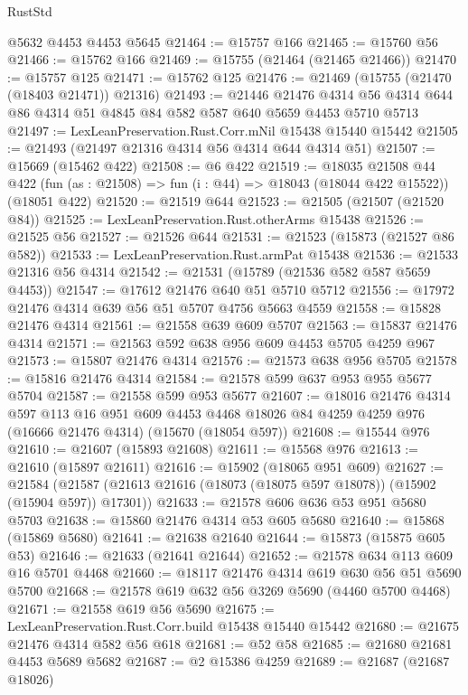 \begin{lexlean}{RustStd}
\begin{coremodule}
    @5632
    @4453
    @4453
    @5645
@21464 := @15757 @166
@21465 := @15760 @56
@21466 := @15762 @166
@21469 := @15755 (@21464 (@21465 @21466))
@21470 := @15757 @125
@21471 := @15762 @125
@21476 := @21469 (@15755 (@21470 (@18403 @21471)) @21316)
@21493 := @21446
    @21476
    @4314
    @56
    @4314
    @644
    @86
    @4314
    @51
    @4845
    @84
    @582
    @587
    @640
    @5659
    @4453
    @5710
    @5713
@21497 := LexLeanPreservation.Rust.Corr.mNil @15438 @15440 @15442
@21505 := @21493 (@21497 @21316 @4314 @56 @4314 @644 @4314 @51)
@21507 := @15669 (@15462 @422)
@21508 := @6 @422
@21519 := @18035
    @21508
    @44
    @422
    (fun (as : @21508) => fun (i : @44) => @18043 (@18044 @422 @15522))
    (@18051 @422)
@21520 := @21519 @644
@21523 := @21505 (@21507 (@21520 @84))
@21525 := LexLeanPreservation.Rust.otherArms @15438
@21526 := @21525 @56
@21527 := @21526 @644
@21531 := @21523 (@15873 (@21527 @86 @582))
@21533 := LexLeanPreservation.Rust.armPat @15438
@21536 := @21533 @21316 @56 @4314
@21542 := @21531 (@15789 (@21536 @582 @587 @5659 @4453))
@21547 := @17612 @21476 @640 @51 @5710 @5712
@21556 := @17972 @21476 @4314 @639 @56 @51 @5707 @4756 @5663 @4559
@21558 := @15828 @21476 @4314
@21561 := @21558 @639 @609 @5707
@21563 := @15837 @21476 @4314
@21571 := @21563 @592 @638 @956 @609 @4453 @5705 @4259 @967
@21573 := @15807 @21476 @4314
@21576 := @21573 @638 @956 @5705
@21578 := @15816 @21476 @4314
@21584 := @21578 @599 @637 @953 @955 @5677 @5704
@21587 := @21558 @599 @953 @5677
@21607 := @18016
    @21476
    @4314
    @597
    @113
    @16
    @951
    @609
    @4453
    @4468
    @18026
    @84
    @4259
    @4259
    @976
    (@16666 @21476 @4314)
    (@15670 (@18054 @597))
@21608 := @15544 @976
@21610 := @21607 (@15893 @21608)
@21611 := @15568 @976
@21613 := @21610 (@15897 @21611)
@21616 := @15902 (@18065 @951 @609)
@21627 := @21584
    (@21587 (@21613 @21616 (@18073 (@18075 @597 @18078)) (@15902 (@15904 @597)) @17301))
@21633 := @21578 @606 @636 @53 @951 @5680 @5703
@21638 := @15860 @21476 @4314 @53 @605 @5680
@21640 := @15868 (@15869 @5680)
@21641 := @21638 @21640
@21644 := @15873 (@15875 @605 @53)
@21646 := @21633 (@21641 @21644)
@21652 := @21578 @634 @113 @609 @16 @5701 @4468
@21660 := @18117 @21476 @4314 @619 @630 @56 @51 @5690 @5700
@21668 := @21578 @619 @632 @56 @3269 @5690 (@4460 @5700 @4468)
@21671 := @21558 @619 @56 @5690
@21675 := LexLeanPreservation.Rust.Corr.build @15438 @15440 @15442
@21680 := @21675 @21476 @4314 @582 @56 @618
@21681 := @52 @58
@21685 := @21680 @21681 @4453 @5689 @5682
@21687 := @2 @15386 @4259
@21689 := @21687 (@21687 @18026)

\end{coremodule}
\end{lexlean}
